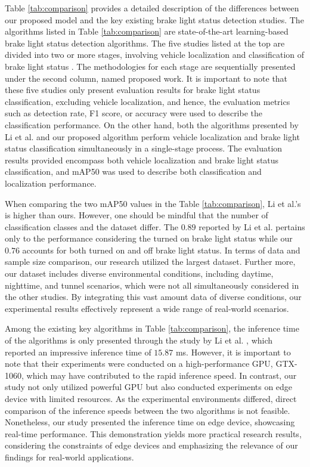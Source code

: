 Table \ref{tab:comparison} provides a detailed description of the differences between our proposed model and the key existing brake light status detection studies.
The algorithms listed in Table \ref{tab:comparison} are state-of-the-art learning-based brake light status detection algorithms. 
The five studies listed at the top are divided into two or more stages, involving vehicle localization and classification of brake light status \cite{cui2015vision,nava2019collision,pirhonen2022brake,wang2016appearance,kim2022detecting}.
The methodologies for each stage are sequentially presented under the second column, named proposed work.
It is important to note that these five studies only present evaluation results for brake light status classification, excluding vehicle localization, and hence, the evaluation metrics such as detection rate, F1 score, or accuracy were used to describe the classification performance.
On the other hand, both the algorithms presented by Li et al. \cite{li2020highly} and our proposed algorithm perform vehicle localization and brake light status classification simultaneously in a single-stage process.
The evaluation results provided encompass both vehicle localization and brake light status classification, and mAP50 was used to describe both classification and localization performance.

When comparing the two mAP50 values in the Table \ref{tab:comparison}, Li et al.'s is higher than ours. However, one should be mindful that the number of classification classes and the dataset differ.
The $0.89$ reported by Li et al. \cite{li2020highly} pertains only to the performance considering the turned on brake light status while our $0.76$ accounts for both turned on and off brake light status.
In terms of data and sample size comparison, our research utilized the largest dataset. 
Further more, our dataset includes diverse environmental conditions, including daytime, nighttime, and tunnel scenarios, which were not all simultaneously considered in the other studies.
By integrating this vast amount data of diverse conditions, our experimental results effectively represent a wide range of real-world scenarios.

Among the existing key algorithms in Table \ref{tab:comparison}, the inference time of the algorithms is only presented through the study by Li et al. \cite{li2020highly}, which reported an impressive inference time of $15.87$ ms.
However, it is important to note that their experiments were conducted on a high-performance GPU, GTX-1060, which may have contributed to the rapid inference speed.
In contrast, our study not only utilized powerful GPU but also conducted experiments on edge device with limited resources.
As the experimental environments differed, direct comparison of the inference speeds between the two algorithms is not feasible.
Nonetheless, our study presented the inference time on edge device, showcasing real-time performance. This demonstration yields more practical research results, considering the constraints of edge devices and emphasizing the relevance of our findings for real-world applications.